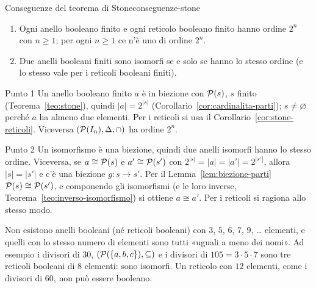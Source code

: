 \begin{concetto}
\begin{Corollario}{Conseguenze del teorema di Stone}{conseguenze-stone}
    \begin{prerequisiti}
    \end{prerequisiti}
    \begin{enumerate}
        \item Ogni anello booleano finito e ogni reticolo booleano finito hanno ordine $2^n$ con $n \geq 1$; per ogni $n \geq 1$ ce n'è uno di ordine $2^n$.
        \item Due anelli booleani finiti sono isomorfi se e solo se hanno lo stesso ordine (e lo stesso vale per i reticoli booleani finiti).
    \end{enumerate}
\end{Corollario}
\begin{dimostrazione}
    \begin{caso}{Punto 1}
        Un anello booleano finito $a$ è in biezione con $\mathcal{P}(s)$, $s$ finito (Teorema~\ref{teo:stone}), quindi $|a| = 2^{|s|}$ (Corollario~\ref{cor:cardinalita-parti}); $s \neq \varnothing$ perché $a$
        ha almeno due elementi. Per i reticoli si usa il Corollario~\ref{cor:stone-reticoli}. Viceversa $(\mathcal{P}(I_n), \Delta, \cap)$ ha ordine $2^n$.
    \end{caso}
    \begin{caso}{Punto 2}
        Un isomorfismo è una biezione, quindi due anelli isomorfi hanno lo stesso ordine. Viceversa, se $a \cong \mathcal{P}(s)$ e $a' \cong \mathcal{P}(s')$ con $2^{|s|} = |a| = |a'| = 2^{|s'|}$,
        allora $|s| = |s'|$ e c'è una biezione $g \colon s \to s'$. Per il Lemma~\ref{lem:biezione-parti} $\mathcal{P}(s) \cong \mathcal{P}(s')$, e componendo gli isomorfismi (e le loro
        inverse, Teorema~\ref{teo:inverso-isomorfismo}) si ottiene $a \cong a'$. Per i reticoli si ragiona allo stesso modo.
    \end{caso}
\end{dimostrazione}
\end{concetto}

\begin{spiegazione}
    Non esistono anelli booleani (né reticoli booleani) con $3$, $5$, $6$, $7$, $9$, \dots{} elementi, e quelli con lo stesso numero di elementi sono tutti
    «uguali a meno dei nomi». Ad esempio i divisori di $30$, $(\mathcal{P}(\{a, b, c\}), \subseteq)$ e i divisori di $105 = 3 \cdot 5 \cdot 7$ sono tre reticoli booleani di $8$ elementi:
    sono isomorfi. Un reticolo con $12$ elementi, come i divisori di $60$, non può essere booleano.
\end{spiegazione}

